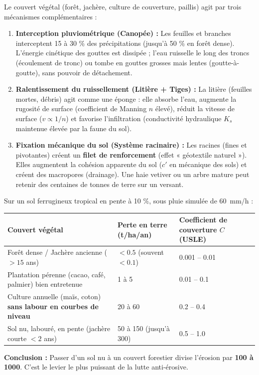 \documentclass[11pt]{article}
\begin{document}
\begin{definition}
Le couvert végétal (forêt, jachère, culture de couverture, paillis) agit par trois mécanismes complémentaires :
\begin{enumerate}
    \item \textbf{Interception pluviométrique (Canopée) :} Les feuilles et branches interceptent 15 à 30 \% des précipitations (jusqu'à 50 \% en forêt dense). L'énergie cinétique des gouttes est dissipée ; l'eau ruisselle le long des troncs (écoulement de tronc) ou tombe en gouttes grosses mais lentes (goutte-à-goutte), sans pouvoir de détachement.
    \item \textbf{Ralentissement du ruissellement (Litière + Tiges) :} La litière (feuilles mortes, débris) agit comme une éponge : elle absorbe l'eau, augmente la rugosité de surface (coefficient de Manning $n$ élevé), réduit la vitesse de surface ($v \propto 1/n$) et favorise l'infiltration (conductivité hydraulique $K_s$ maintenue élevée par la faune du sol).
    \item \textbf{Fixation mécanique du sol (Système racinaire) :} Les racines (fines et pivotantes) créent un \textbf{filet de renforcement} (effet « géotextile naturel »). Elles augmentent la cohésion apparente du sol ($c'$ en mécanique des sols) et créent des macropores (drainage). Une haie vetiver ou un arbre mature peut retenir des centaines de tonnes de terre sur un versant.
\end{enumerate}
\end{definition}

\begin{exemplebox}
Sur un sol ferrugineux tropical en pente à 10 \%, sous pluie simulée de \SI{60}{mm/h} :
\begin{center}
\begin{tabularx}{\linewidth}{|l|X|X|}\hline
\textbf{Couvert végétal} & \textbf{Perte en terre (t/ha/an)} & \textbf{Coefficient de couverture $C$ (USLE)} \\ \hline
Forêt dense / Jachère ancienne ($>15$ ans) & $< \num{0,5}$ (souvent $< \num{0,1}$) & \num{0,001} -- \num{0,01} \\
Plantation pérenne (cacao, café, palmier) bien entretenue & \num{1} à \num{5} & \num{0,01} -- \num{0,1} \\
Culture annuelle (maïs, coton) \textbf{sans labour en courbes de niveau} & \num{20} à \num{60} & \num{0,2} -- \num{0,4} \\
Sol nu, labouré, en pente (jachère courte $<2$ ans) & \num{50} à \num{150} (jusqu'à \num{300}) & \num{0,5} -- \num{1,0} \\ \hline
\end{tabularx}
\end{center}
\textbf{Conclusion :} Passer d'un sol nu à un couvert forestier divise l'érosion par \textbf{100 à 1000}. C'est le levier le plus puissant de la lutte anti-érosive.
\end{exemplebox}
\end{document}
